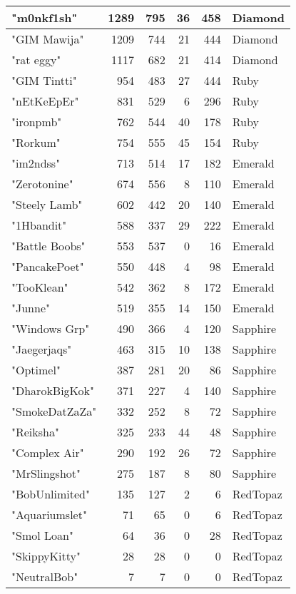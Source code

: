 \documentclass{article}
\begin{document}
\begin{table}[htbp]
\begin{tabular}{|l|r|r|r|r|l|}
"m0nkf1sh" & 1289 & 795 & 36 & 458 & Diamond \\ \hline
"GIM Mawija" & 1209 & 744 & 21 & 444 & Diamond \\ \hline
"rat eggy" & 1117 & 682 & 21 & 414 & Diamond \\ \hline
"GIM Tintti" & 954 & 483 & 27 & 444 & Ruby \\ \hline
"nEtKeEpEr" & 831 & 529 & 6 & 296 & Ruby \\ \hline
"ironpmb" & 762 & 544 & 40 & 178 & Ruby \\ \hline
"Rorkum" & 754 & 555 & 45 & 154 & Ruby \\ \hline
"im2ndss" & 713 & 514 & 17 & 182 & Emerald \\ \hline
"Zerotonine" & 674 & 556 & 8 & 110 & Emerald \\ \hline
"Steely Lamb" & 602 & 442 & 20 & 140 & Emerald \\ \hline
"1Hbandit" & 588 & 337 & 29 & 222 & Emerald \\ \hline
"Battle Boobs" & 553 & 537 & 0 & 16 & Emerald \\ \hline
"PancakePoet" & 550 & 448 & 4 & 98 & Emerald \\ \hline
"TooKlean" & 542 & 362 & 8 & 172 & Emerald \\ \hline
"Junne" & 519 & 355 & 14 & 150 & Emerald \\ \hline
"Windows Grp" & 490 & 366 & 4 & 120 & Sapphire \\ \hline
"Jaegerjaqs" & 463 & 315 & 10 & 138 & Sapphire \\ \hline
"Optimel" & 387 & 281 & 20 & 86 & Sapphire \\ \hline
"DharokBigKok" & 371 & 227 & 4 & 140 & Sapphire \\ \hline
"SmokeDatZaZa" & 332 & 252 & 8 & 72 & Sapphire \\ \hline
"Reiksha" & 325 & 233 & 44 & 48 & Sapphire \\ \hline
"Complex Air" & 290 & 192 & 26 & 72 & Sapphire \\ \hline
"MrSlingshot" & 275 & 187 & 8 & 80 & Sapphire \\ \hline
"BobUnlimited" & 135 & 127 & 2 & 6 & RedTopaz \\ \hline
"Aquariumslet" & 71 & 65 & 0 & 6 & RedTopaz \\ \hline
"Smol Loan" & 64 & 36 & 0 & 28 & RedTopaz \\ \hline
"SkippyKitty" & 28 & 28 & 0 & 0 & RedTopaz \\ \hline
"NeutralBob" & 7 & 7 & 0 & 0 & RedTopaz \\ \hline
\end{tabular}
\end{table}
\end{document}
